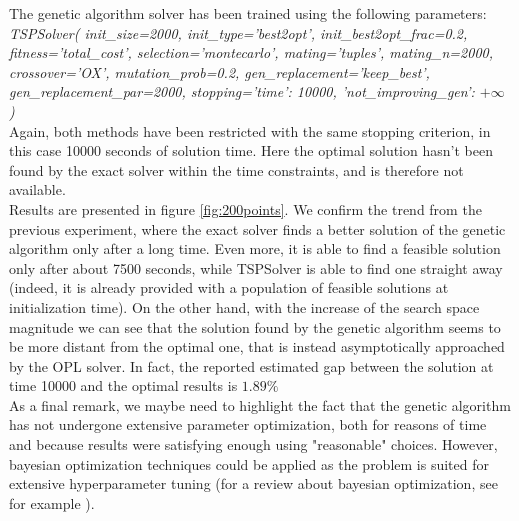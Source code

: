\documentclass{article}
\begin{document}
The genetic algorithm solver has been trained using the following parameters: \\
\newline
\textit{TSPSolver(
    init\_size=2000, init\_type='best2opt', init\_best2opt\_frac=0.2, fitness='total\_cost',
    selection='montecarlo', mating='tuples', mating\_n=2000, crossover='OX', mutation\_prob=0.2,
    gen\_replacement='keep\_best', gen\_replacement\_par=2000,
    stopping={'time': 10000, 'not\_improving\_gen': $+\infty$}
)} \\
\newline
Again, both methods have been restricted with the same stopping criterion, in this case 10000 seconds of solution time. Here the optimal solution hasn't been found by the exact solver within the time constraints, and is therefore not available. \\
Results are presented in figure \ref{fig:200points}. We confirm the trend from the previous experiment, where the exact solver finds a better solution of the genetic algorithm only after a long time. Even more, it is able to find a feasible solution only after about 7500 seconds, while TSPSolver is able to find one straight away (indeed, it is already provided with a population of feasible solutions at initialization time). On the other hand, with the increase of the search space magnitude we can see that the solution found by the genetic algorithm seems to be more distant from the optimal one, that is instead asymptotically approached by the OPL solver. In fact, the reported estimated gap between the solution at time 10000 and the optimal results is $1.89\%$ \\
\newline
As a final remark, we maybe need to highlight the fact that the genetic algorithm has not undergone extensive parameter optimization, both for reasons of time and because results were satisfying enough using "reasonable" choices. However, bayesian optimization techniques could be applied as the problem is suited for extensive hyperparameter tuning (for a review about bayesian optimization, see for example \cite{shahriari2015taking}).







\end{document}
